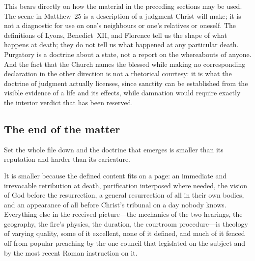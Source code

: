 This bears directly on how the material in the preceding sections may be used. The scene in Matthew~25 is a description of a judgment Christ will make; it is not a diagnostic for use on one's neighbours or one's relatives or oneself. The definitions of Lyons, Benedict~XII, and Florence tell us the shape of what happens at death; they do not tell us what happened at any particular death. Purgatory is a doctrine about a state, not a report on the whereabouts of anyone. And the fact that the Church names the blessed while making no corresponding declaration in the other direction is not a rhetorical courtesy: it is what the doctrine of judgment actually licenses, since sanctity can be established from the visible evidence of a life and its effects, while damnation would require exactly the interior verdict that has been reserved.

\subsection{The end of the matter}

Set the whole file down and the doctrine that emerges is smaller than its reputation and harder than its caricature.

It is smaller because the defined content fits on a page: an immediate and irrevocable retribution at death, purification interposed where needed, the vision of God before the resurrection, a general resurrection of all in their own bodies, and an appearance of all before Christ's tribunal on a day nobody knows. Everything else in the received picture---the mechanics of the two hearings, the geography, the fire's physics, the duration, the courtroom procedure---is theology of varying quality, some of it excellent, none of it defined, and much of it fenced off from popular preaching by the one council that legislated on the subject and by the most recent Roman instruction on it.

